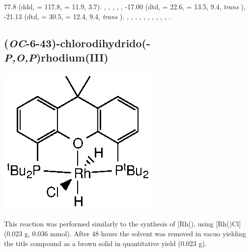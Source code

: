 77.8 (ddd, \JRhP{} = 117.8, \JPH{} = 11.9, 3.7).
,
,
,
,
,
-17.00 (dtd, \JRhH{} = 22.6, \JPH{} = 13.5, \JHH{} 9.4,  \emph{trans} ),
-21.13 (dtd, \JRhH{} = 30.5, \JPH{} = 12.4, \JHH{} 9.4,  \emph{trans} ).
,
,
,
,
,
,
,
,
,
,
.



\subsection*{(\emph{OC}-6-43)-chlorodihydrido(\tBuxantphosk-\emph{P,O,P})rhodium(III)}

\begin{structure}[h]
\begin{center}
\includegraphics{../Structures/CtBuRhClH2.eps}
\end{center}
\end{structure}

This reaction was performed similarly to the synthesis of [Rh(\tBusixantphos)\ce{Cl(H)2]}, using [Rh(\tBuxantphos)Cl] (0.023 g, 0.036 mmol).  After 48 hours the solvent was removed in vacuo yielding the title compound as a brown solid in quantitative yield (0.023 g).

